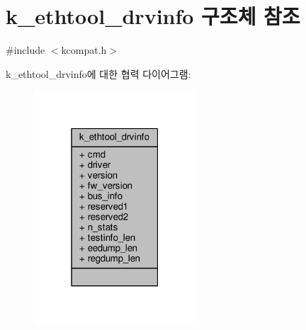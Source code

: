 \hypertarget{structk__ethtool__drvinfo}{}\section{k\+\_\+ethtool\+\_\+drvinfo 구조체 참조}
\label{structk__ethtool__drvinfo}


{\ttfamily \#include $<$kcompat.\+h$>$}



k\+\_\+ethtool\+\_\+drvinfo에 대한 협력 다이어그램\+:
\nopagebreak
\begin{figure}[H]
\begin{center}
\leavevmode
\includegraphics[width=171pt]{structk__ethtool__drvinfo__coll__graph}
\end{center}
\end{figure}
